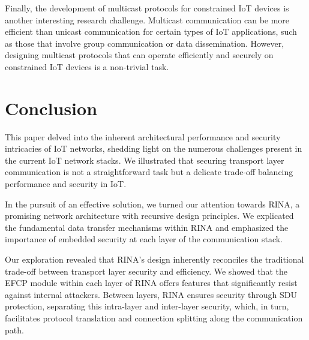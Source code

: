 \documentclass{ieeeaccess}
\begin{document}
Finally, the development of multicast protocols for constrained IoT devices is another interesting research challenge. Multicast communication can be more efficient than unicast communication for certain types of IoT applications, such as those that involve group communication or data dissemination. However, designing multicast protocols that can operate efficiently and securely on constrained IoT devices is a non-trivial task.

\section{Conclusion}
\label{sec:conclusion}
%
This paper delved into the inherent architectural performance and security intricacies of IoT networks, shedding light on the numerous challenges present in the current IoT network stacks. We illustrated that securing transport layer communication is not a straightforward task but a delicate trade-off balancing performance and security in IoT.

In the pursuit of an effective solution, we turned our attention towards RINA, a promising network architecture with recursive design principles. We explicated the fundamental data transfer mechanisms within RINA and emphasized the importance of embedded security at each layer of the communication stack.

Our exploration revealed that RINA's design inherently reconciles the traditional trade-off between transport layer security and efficiency. We showed that the EFCP module within each layer of RINA offers features that significantly resist against internal attackers. Between layers, RINA ensures security through SDU protection, separating this intra-layer and inter-layer security, which, in turn, facilitates protocol translation and connection splitting along the communication path.
\end{document}
